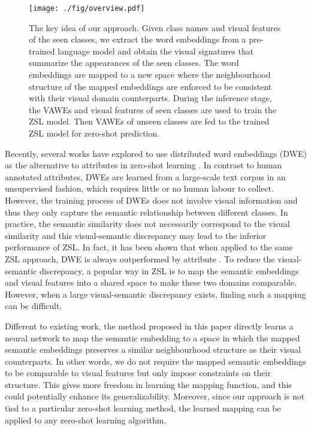 \documentclass{bmvc2k}
\begin{document}
\begin{figure}[ht]
\begin{center}\label{fig:overview}
   \texttt{[image: ./fig/overview.pdf]}
\end{center}
   \caption{The key idea of our approach. Given class names and visual features of the seen classes, we extract the word embeddings from a pre-trained language model and obtain the visual signatures that summarize the appearances of the seen classes. The word embeddings are mapped to a new space where the neighbourhood structure of the mapped embeddings are enforced to be consistent with their visual domain counterparts. During the inference stage, the VAWEs and visual features of seen classes are used to train the ZSL model. Then VAWEs of unseen classes are fed to the trained ZSL model for zero-shot prediction.}
\label{fig:overview}
\end{figure}

%
%
%
%
%
%
%
%
%
%
%
%
%
%
%
%

Recently, several works have explored to use distributed word embeddings (DWE)  \cite{word2vec,glove} as the alternative to attributes in zero-shot learning \cite{Frome2013NIPS_devise,NorouziConse13}. In contrast to human annotated attributes, DWEs are learned from a large-scale text corpus in an unsupervised fashion, which requires little or no human labour to collect. However, the training process of DWEs does not involve visual information and thus they only capture the semantic relationship between different classes. In practice, the semantic similarity does not necessarily correspond to the visual similarity and this visual-semantic discrepancy may lead to the inferior performance of ZSL. In fact, it has been shown that when applied to the same ZSL approach, DWE is always outperformed by attribute \cite{Akata15output,SynC2016,LatEm2016}. To reduce the visual-semantic discrepancy, a popular way in ZSL is to map the semantic embeddings and visual features into a shared space \cite{Frome2013NIPS_devise,Romera2015ZSL,LatEm2016,Zhang2016CVPR, LongBMVC16} to make these two domains comparable. However, when a large visual-semantic discrepancy exists, finding such a mapping can be difficult.%

Different to existing work, the method proposed in this paper directly learns a neural network to map the semantic embedding to a space in which the mapped semantic embeddings preserves a similar neighbourhood structure as their visual counterparts. In other words, we do not require the mapped semantic embeddings to be comparable to visual features but only impose constraints on their structure. This gives more freedom in learning the mapping function, and this could potentially enhance its generalizability. Moreover, since our approach is not tied to a particular zero-shot learning method, the learned mapping can be applied to any zero-shot learning algorithm.
%
\end{document}
